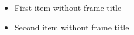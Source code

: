 \documentclass[14pt,t]{beamer-accessibility}
\begin{document}
\begin{frame}
\begin{itemize}
\item First item without frame title
\item Second item without frame title
\end{itemize}
\end{frame}
\end{document}
